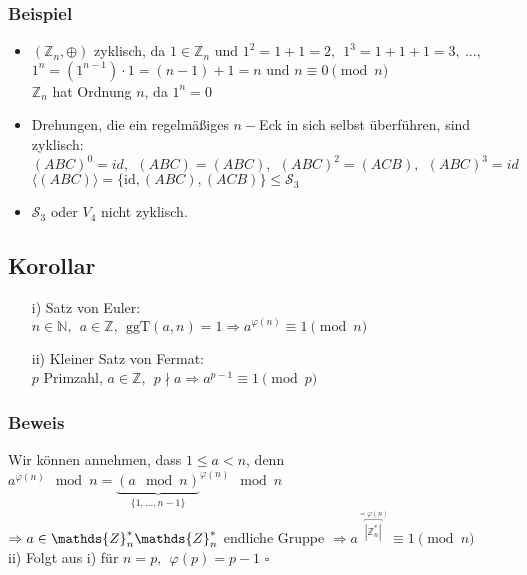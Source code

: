 \documentclass[a4paper, 12pt,titlepage, pdf, headsepline]{article}
\newcommand{\id}{\textrm{id}}
\renewcommand{\>}{\rightarrow}
\renewcommand{\*}{\cdot}
\renewcommand{\phi}{\varphi}
\begin{document}
	      \subsubsection*{Beispiel}
	      \begin{itemize}
	      	\item $(\mathds{Z}_n, \oplus)$ zyklisch, da $1 \in \mathds{Z}_n$ und $1^2 = 1 + 1 = 2,~~ 1^3 = 1 + 1 +1 = 3,~...,$\\$ 1^n = (1^{n-1}) \cdot 1 = (n -1) + 1 = n\textrm{ und } n \equiv 0 \pmod{n}$ \\
	      	      $\mathds{Z}_n$ hat Ordnung $n$, da $1^n = 0$
	      	\item Drehungen, die ein regelmäßiges $n-$Eck in sich selbst überführen, sind zyklisch: \\
	      	      $(ABC)^0 = id,~~ (ABC) = (ABC),~~ (ABC)^2 = (ACB),~~ (ABC)^3 = id$\\
	      	      $\langle (ABC) \rangle = \{\id, (ABC), (ACB)\} \leq \mathscr{S}_3$
	      	\item $\mathscr{S}_3$ oder $V_4$ nicht zyklisch.
	      \end{itemize}
	      \subsection{Korollar}
	      \begin{itemize}
	      	\item[i)] Satz von Euler:\\ $n \in \mathds{N},~~ a \in \mathds{Z},~~ \text{ggT}(a,n) = 1 \Rightarrow a^{\phi(n)} \equiv 1 \pmod{n}$
	      	\item[ii)] Kleiner Satz von Fermat:\\ $p$ Primzahl, $a \in \mathds{Z},~~ p \nmid a \Rightarrow a^{p-1} \equiv 1 \pmod{p}$
	      \end{itemize}
	      \subsubsection*{Beweis}
	      Wir können annehmen, dass $1 \leq a < n$, denn \\$a^{\phi(n)} \mod n = {\underbrace{(a \mod n)}_{\{1,...,n-1\}}}^{\phi(n)}\mod n$ \\
	      $\Rightarrow a \in \mathds{Z}^*_n \\
	      \mathds{Z}^*_n$ endliche Gruppe $\Rightarrow a^{\overbracket{|\mathds{Z}^*_n|}^{ = \phi(n)}} \equiv 1 \pmod{n}$\\
	      ii) Folgt aus i) für $n = p,~~ \phi(p) = p-1$
	      \hfill$\square$
	      \newpage
\end{document}
